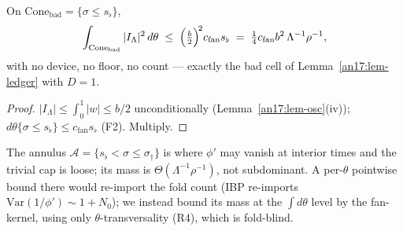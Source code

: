 \begin{lemma}\label{an17:lem-deep}
On $\mathrm{Cone}_{\mathrm{bad}}=\{\sigma\le s_\flat\}$,
\begin{equation}\label{eq:an17-deepmass}
 \int_{\mathrm{Cone}_{\mathrm{bad}}}|I_\Lambda|^2\,d\theta\;\le\;
 \Bigl(\tfrac b2\Bigr)^{\!2}c_{\mathrm{fan}}s_\flat
 \;=\;\tfrac14 c_{\mathrm{fan}}b^2\,\Lambda^{-1}\rho^{-1},
\end{equation}
with no device, no floor, no count --- exactly the bad cell of
Lemma~\ref{an17:lem-ledger} with $D=1$.
\end{lemma}
\begin{proof}
$|I_\Lambda|\le\int_0^1|w|\le b/2$ unconditionally
(Lemma~\ref{an17:lem-osc}(iv)); $d\theta\{\sigma\le s_\flat\}\le c_{\mathrm{fan}}
s_\flat$ (F2). Multiply.
\end{proof}

The annulus $\mathcal A=\{s_\flat<\sigma\le\sigma_\dagger\}$ is where $\phi'$ may
vanish at interior times and the trivial cap is loose; its mass is
$\Theta(\Lambda^{-1}\rho^{-1})$, not subdominant. A per-$\theta$ pointwise bound
there would re-import the fold count (IBP re-imports $\mathrm{Var}(1/\phi')\sim
1+N_0$); we instead bound its mass at the $\int d\theta$ level by the fan-kernel,
using only $\theta$-transversality (R4), which is fold-blind.

